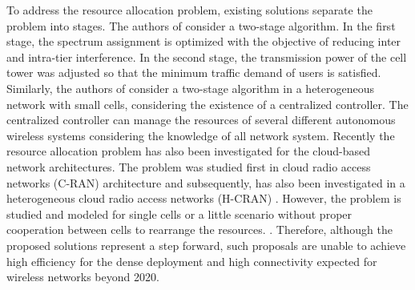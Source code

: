 To address the resource allocation problem, existing solutions separate the problem into stages.
The authors of \cite{Xiong2012} consider a two-stage algorithm.
In the first stage, the spectrum assignment is optimized with the objective of reducing inter and intra-tier interference. In the second stage, the transmission power of the cell tower was adjusted so that the minimum traffic demand of users is satisfied.
Similarly, the authors of \cite{Amin2013} consider a two-stage algorithm in a heterogeneous network with small cells, considering the existence of a centralized controller.
The centralized controller can manage the resources of several different autonomous wireless systems considering the knowledge of all network system. 
Recently the resource allocation problem has also been investigated for the cloud-based network architectures.
The problem was studied first in cloud radio access networks (C-RAN) architecture and subsequently, has also been investigated in a heterogeneous cloud radio access networks (H-CRAN) \cite{Peng2015}. 
However, the problem is studied and modeled for single cells or a little scenario without proper cooperation between cells to rearrange the resources. . 
Therefore, although the proposed solutions represent a step forward, such proposals are unable to achieve high efficiency for the dense deployment and high connectivity expected for wireless networks beyond 2020.




